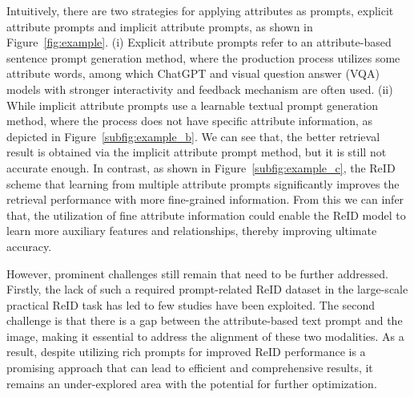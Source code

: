 \documentclass[letterpaper]{article} %
\begin{document}
Intuitively, there are two strategies for applying attributes as prompts, explicit attribute prompts and implicit attribute prompts, as shown in Figure~\ref{fig:example}. (i) Explicit attribute prompts refer to an attribute-based sentence prompt generation method, where the production process utilizes some attribute words, among which ChatGPT and visual question answer (VQA) models \cite{yu2019mcan, Wang2022vqa} with stronger interactivity and feedback mechanism are often used. (ii) While implicit attribute prompts use a learnable textual prompt generation method, where the process does not have specific attribute information, as depicted in Figure~\ref{subfig:example_b}. We can see that, the better retrieval result is obtained via the implicit attribute prompt method, but it is still not accurate enough. In contrast, as shown in Figure~\ref{subfig:example_c}, the ReID scheme that learning from multiple attribute prompts significantly improves the retrieval performance with more fine-grained information. From this we can infer that, the utilization of fine attribute information could enable the ReID model to learn more auxiliary features and relationships, thereby improving ultimate accuracy.

However, prominent challenges still remain that need to be further addressed. Firstly, the lack of such a required prompt-related ReID dataset in the large-scale practical ReID task has led to few studies have been exploited. The second challenge is that there is a gap between the attribute-based text prompt and the image, making it essential to address the alignment of these two modalities. As a result, despite utilizing rich prompts for improved ReID performance is a promising approach that can lead to efficient and comprehensive results, it remains an under-explored area with the potential for further optimization.
\end{document}
